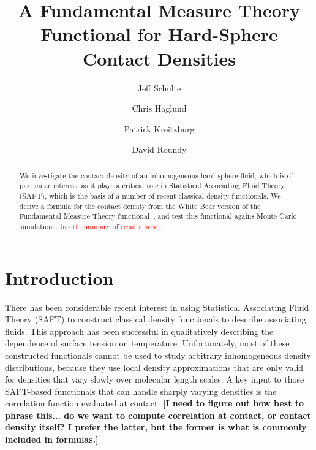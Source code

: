 \documentclass[letterpaper,twocolumn,amsmath,amssymb,jcp,10pt,aip]{revtex4-1}
\newcommand{\red}[1]{{\bf \color{red} #1}}
\newcommand{\fixme}[1]{\red{[#1]}}
\begin{document}
\title{A Fundamental Measure Theory Functional for Hard-Sphere Contact Densities}

\author{Jeff Schulte}
\author{Chris Haglund}
\author{Patrick Kreitzburg}
\author{David Roundy}


\begin{abstract}
  We investigate the contact density of an inhomogeneous hard-sphere
  fluid, which is of particular interest, as it plays a critical role
  in Statistical Associating Fluid Theory (SAFT), which is the basis
  of a number of recent classical density functionals.  We derive a
  formula for the contact density from the White Bear version of the
  Fundamental Measure Theory functional~\cite{roth2002whitebear}, and
  test this functional agains Monte Carlo simulations.
  \textcolor{red}{Insert summary of results here...}
\end{abstract}

\maketitle

\section{Introduction}

\newcommand\saftlocaldft{felipe2001examination, gloor2002saft,%
  gloor2004accurate, clark2006developing, gloor2007prediction,%
  kahl2008modified, gross2009density}
\newcommand\saftnonlocaldft{yu2002fmt-dft-inhomogeneous-associating,%
  fu2005vapor-liquid-dft,bryk2006density}

There has been considerable recent interest in using Statistical
Associating Fluid Theory (SAFT) to construct classical density
functionals to describe associating
fluids\cite{\saftlocaldft,\saftnonlocaldft}.  This approach has been
successful in qualitatively describing the dependence of surface
tension on temperature.  Unfortunately, most of these constructed
functionals\cite{\saftlocaldft} cannot be used to study arbitrary
inhomogeneous density distributions, because they use local density
approximations that are only valid for densities that vary slowly over
molecular length scales.  A key input to those SAFT-based functionals
that can handle sharply varying densities is the correlation function
evaluated at contact. \fixme{I need to figure out how best to phrase
  this... do we want to compute correlation at contact, or contact
  density itself? I prefer the latter, but the former is what is
  commonly included in formulas.}
\end{document}
